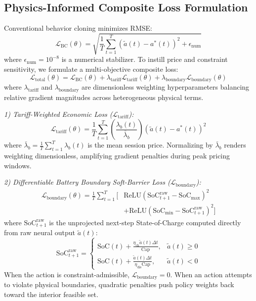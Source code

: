 \documentclass[journal]{IEEEtran}
\theoremstyle{remark}
\begin{document}
\subsection{Physics-Informed Composite Loss Formulation}
Conventional behavior cloning minimizes RMSE:
\begin{equation}
\mathcal{L}_{\mathrm{BC}}(\theta) = \sqrt{\frac{1}{T} \sum_{t=1}^T (\tilde{a}(t) - a^*(t))^2 + \epsilon_{\mathrm{num}}}
\label{eq:l_bc}
\end{equation}
where $\epsilon_{\mathrm{num}} = 10^{-8}$ is a numerical stabilizer. To instill price and constraint sensitivity, we formulate a multi-objective composite loss:
\begin{equation}
\mathcal{L}_{\mathrm{total}}(\theta) = \mathcal{L}_{\mathrm{BC}}(\theta) + \lambda_{\mathrm{tariff}} \mathcal{L}_{\mathrm{tariff}}(\theta) + \lambda_{\mathrm{boundary}} \mathcal{L}_{\mathrm{boundary}}(\theta)
\label{eq:l_total}
\end{equation}
where $\lambda_{\mathrm{tariff}}$ and $\lambda_{\mathrm{boundary}}$ are dimensionless weighting hyperparameters balancing relative gradient magnitudes across heterogeneous physical terms.

\textit{1) Tariff-Weighted Economic Loss ($\mathcal{L}_{\mathrm{tariff}}$):}
\begin{equation}
\mathcal{L}_{\mathrm{tariff}}(\theta) = \frac{1}{T} \sum_{t=1}^T \left(\frac{\lambda_b(t)}{\bar{\lambda}_b}\right) (\tilde{a}(t) - a^*(t))^2
\label{eq:l_tariff}
\end{equation}
where $\bar{\lambda}_b = \frac{1}{T}\sum_{t=1}^T \lambda_b(t)$ is the mean session price. Normalizing by $\bar{\lambda}_b$ renders weighting dimensionless, amplifying gradient penalties during peak pricing windows.

\textit{2) Differentiable Battery Boundary Soft-Barrier Loss ($\mathcal{L}_{\mathrm{boundary}}$):}
\begin{align}
\mathcal{L}_{\mathrm{boundary}}(\theta) = \frac{1}{T} \sum_{t=1}^T \Big[ &\mathrm{ReLU}(\mathrm{SoC}_{t+1}^{\mathrm{raw}} - \mathrm{SoC}_{\max})^2 \nonumber\\
&+ \mathrm{ReLU}(\mathrm{SoC}_{\min} - \mathrm{SoC}_{t+1}^{\mathrm{raw}})^2 \Big]
\label{eq:l_boundary}
\end{align}
where $\mathrm{SoC}_{t+1}^{\mathrm{raw}}$ is the unprojected next-step State-of-Charge computed directly from raw neural output $\tilde{a}(t)$:
\begin{equation}
\mathrm{SoC}_{t+1}^{\mathrm{raw}} = \begin{cases}
\mathrm{SoC}(t) + \frac{\eta_{\mathrm{ch}} \tilde{a}(t) \Delta t}{\mathrm{Cap}}, & \tilde{a}(t) \ge 0 \\
\mathrm{SoC}(t) + \frac{\tilde{a}(t) \Delta t}{\eta_{\mathrm{dis}} \mathrm{Cap}}, & \tilde{a}(t) < 0
\end{cases}
\label{eq:soc_raw}
\end{equation}
When the action is constraint-admissible, $\mathcal{L}_{\mathrm{boundary}} = 0$. When an action attempts to violate physical boundaries, quadratic penalties push policy weights back toward the interior feasible set.
\end{document}
